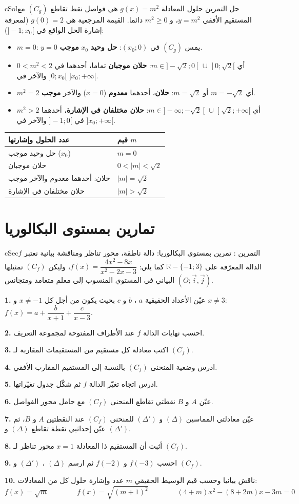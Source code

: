 \documentclass[12pt,a4paper]{article}
\newenvironment{BOX}[2]{\begin{otherlanguage}{english}\begin{arbox}{#1}{#2}}{\end{arbox}\end{otherlanguage}}
\newcounter{exo}
\newenvironment{tamrin}[1]{\stepcounter{exo}\begin{BOX}{cSec}{التمرين \theexo: #1}}{\end{BOX}}
\newenvironment{hal}{\Needspace{12\baselineskip}\begin{otherlanguage}{english}\begin{arbox}[breakable]{cSol}{حل التمرين \theexo}}{\end{arbox}\end{otherlanguage}}
\newcommand{\R}{\mathbb{R}}
\newcommand{\QQ}[1]{\par\smallskip\textbf{#1.} }
\begin{document}
\begin{hal}
\pb حلول المعادلة $g(x)=m^{2}$ هي فواصل نقط تقاطع $(C_g)$ مع المستقيم الأفقي $y=m^{2}$، و $m^{2}\geqslant0$ دائما. القيمة المرجعية هي $g(0)=2$ (لمعرفة إشارة الحل الواقع في $]-1;x_0[$):
\begin{itemize}
\item $m=0$: $y=0$ يمس $(C_g)$ في $(x_0;0)$: \textbf{حل وحيد} $x_0$ \textbf{موجب}.
\item $0<m^{2}<2$ أي $m\in]-\sqrt2;0[\,\cup\,]0;\sqrt2[$: \textbf{حلان موجبان} تماما، أحدهما في $]0;x_0[$ والآخر في $]x_0;+\infty[$.
\item $m^{2}=2$ أي $m=-\sqrt2$ أو $m=\sqrt2$: \textbf{حلان}، أحدهما \textbf{معدوم} ($x=0$) والآخر \textbf{موجب}.
\item $m^{2}>2$ أي $m\in]-\infty;-\sqrt2[\,\cup\,]\sqrt2;+\infty[$: \textbf{حلان مختلفان في الإشارة}، أحدهما في $]-1;0[$ والآخر في $]x_0;+\infty[$.
\end{itemize}
\begin{center}
\begin{tabular}{|p{}|>{\centering\arraybackslash}p{}|}
\hline\rowcolor{cSec!12}
\textbf{عدد الحلول وإشارتها} & \textbf{قيم $m$}\\\hline
حل وحيد موجب ($x_0$) & $m=0$\\\hline
حلان موجبان & $0<|m|<\sqrt2$\\\hline
حلان: أحدهما معدوم والآخر موجب & $|m|=\sqrt2$\\\hline
حلان مختلفان في الإشارة & $|m|>\sqrt2$\\\hline
\end{tabular}
\end{center}
\end{hal}
\section{تمارين بمستوى البكالوريا}
\begin{tamrin}{تمرين بمستوى البكالوريا: دالة ناطقة، محور تناظر ومناقشة بيانية}
نعتبر $f$ الدالة المعرّفة على $\R-\{-1;3\}$ كما يلي: $f(x)=\dfrac{4x^{2}-8x}{x^{2}-2x-3}$، وليكن $(C_f)$ تمثيلها البياني في المستوي المنسوب إلى معلم متعامد ومتجانس $(O;\vec i,\vec j)$.
\QQ{1} عيّن الأعداد الحقيقية $a$ ، $b$ و $c$ بحيث يكون من أجل كل $x\neq-1$ و $x\neq3$: \ $f(x)=a+\dfrac{b}{x+1}+\dfrac{c}{x-3}$.
\QQ{2} احسب نهايات الدالة $f$ عند الأطراف المفتوحة لمجموعة التعريف.
\QQ{3} اكتب معادلة كل مستقيم من المستقيمات المقاربة لـ $(C_f)$.
\QQ{4} ادرس وضعية المنحنى $(C_f)$ بالنسبة إلى المستقيم المقارب الأفقي.
\QQ{5} ادرس اتجاه تغيّر الدالة $f$ ثم شكّل جدول تغيّراتها.
\QQ{6} عيّن $A$ و $B$ نقطتي تقاطع المنحنى $(C_f)$ مع حامل محور الفواصل.
\QQ{7} عيّن معادلتي المماسين $(\Delta)$ و $(\Delta')$ للمنحنى $(C_f)$ عند النقطتين $A$ و $B$، ثم عيّن إحداثيي نقطة تقاطع $(\Delta)$ و $(\Delta')$.
\QQ{8} أثبت أن المستقيم ذا المعادلة $x=1$ محور تناظر لـ $(C_f)$.
\QQ{9} احسب $f(-3)$ و $f(-2)$ ثم ارسم $(\Delta)$ ، $(\Delta')$ و $(C_f)$.
\QQ{10} ناقش بيانيا وحسب قيم الوسيط الحقيقي $m$ عدد وإشارة حلول كل من المعادلات:
\[f(x)=\sqrt{m}\qquad\qquad f(x)=\sqrt{(m+1)^{2}}\qquad\qquad (4+m)x^{2}-(8+2m)x-3m=0\]
\end{tamrin}
\end{document}
